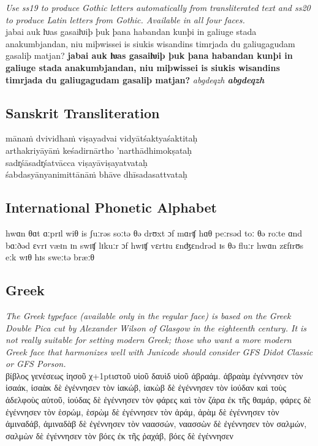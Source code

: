 \documentclass[12pt,a4paper,openany]{book}
\newcommand{\salt}[1]{{\addfontfeatures{Alternate=0}{#1}}}
\begin{document}
{\noindent\small\itshape Use ss19 to produce Gothic letters
  automatically from transliterated text and ss20 to produce Latin
  letters from Gothic. Available in all four faces.}\\[1ex]
{jabai auk ƕas gasaiƕiþ þuk þana
  habandan kunþi in ga\-liuge stada anakumbjandan, niu miþwissei is
  siukis wis\-an\-dins timrjada du galiugagudam gasaliþ matjan?
  {\bfseries jabai auk ƕas gasaiƕiþ þuk þana habandan kunþi in
    ga\-liuge stada anakumbjandan, niu miþwissei is siukis
    wis\-an\-dins timrjada du galiugagudam gasaliþ matjan?}
  \textit{abgdeqzh \bfseries abgdeqzh}}

\subsection*{Sanskrit Transliteration}

\noindent mānaṁ dvividhaṁ viṣayadvai vidyātśaktyaśaktitaḥ \\
     arthakriyāyāṁ keśadirnārtho ’narthādhimokṣataḥ\\[1ex]
sadr̥śāsadr̥śatvācca viṣayāviṣayatvataḥ \\
     śabdasyānyanimittānāṁ bhāve dhīsadasattvataḥ

\subsection*{International Phonetic Alphabet}
hwɑn θɑt ɑːprɪl wiθ is ʃuːrəs soːtə θə drʊxt ɔf mɑrʧ hɑθ peːrsəd toː
θə roːte ɑnd bɑːðəd ɛvrɪ væɪn ɪn swɪʧ lɪkuːr ɔf hwɪʧ vɛrtɪu
ɛnʤɛndrəd ɪs θə fluːr hwɑn zɛfɪrʊs eːk wɪθ hɪs sweːtə bræːθ

\subsection*{Greek}

{\small\itshape The Greek typeface (available only in the regular
  face) is based on the Greek Double Pica cut by Alexander Wilson of
  Glasgow in the eighteenth century. It is not really suitable for
  setting modern Greek; those who want a more modern Greek face that
  harmonizes well with Junicode should consider GFS Didot
  Classic or GFS Porson.}\\[1ex]
{βίβλος
γενέσεως ἰησοῦ χ\kern+1pt\salt{ρ}ιστοῦ υἱοῦ δαυὶδ
υἱοῦ ἀβραάμ.
ἀβραὰμ
ἐγέννησεν τὸν ἰσαάκ, ἰσαὰκ δὲ ἐγέννησεν
τὸν ἰακώβ, ἰακὼβ δὲ ἐγέννησεν τὸν
ἰούδαν καὶ τοὺς ἀδελφοὺς αὐτοῦ,
ἰούδας
δὲ ἐγέννησεν τὸν φάρες καὶ τὸν ζάρα
ἐκ τῆς θαμάρ, φάρες δὲ ἐγέννησεν τὸν
ἑσρώμ, ἑσρὼμ δὲ ἐγέννησεν τὸν ἀράμ,
ἀρὰμ
δὲ ἐγέννησεν τὸν ἀμιναδάβ, ἀμιναδὰβ
δὲ ἐγέννησεν τὸν ναασσών, ναασσὼν δὲ
ἐγέννησεν τὸν σαλμών,
σαλμὼν
δὲ ἐγέννησεν τὸν βόες ἐκ τῆς ῥαχάβ,
βόες δὲ ἐγέννησεν}
\end{document}
